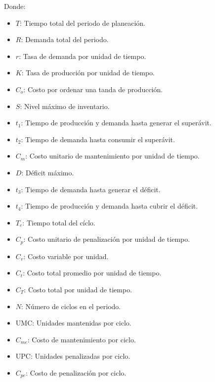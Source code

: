 \documentclass[letterpaper, 12pt]{article}
\begin{document}
    Donde:
    \begin{itemize}
        \item \(T\): Tiempo total del periodo de planeación.
        \item \(R\): Demanda total del periodo.
        \item \(r\): Tasa de demanda por unidad de tiempo.
        \item \(K\): Tasa de producción por unidad de tiempo.
        \item \(C_o\): Costo por ordenar una tanda de producción.
        \item \(S\): Nivel máximo de inventario.
        \item \(t_1\): Tiempo de producción y demanda hasta generar el superávit.
        \item \(t_2\): Tiempo de demanda hasta consumir el superávit.
        \item \(C_m\): Costo unitario de mantenimiento por unidad de tiempo.
        \item \(D\): Déficit máximo.
        \item \(t_3\): Tiempo de demanda hasta generar el déficit.
        \item \(t_4\): Tiempo de producción y demanda hasta cubrir el déficit.
        \item \(T_e\): Tiempo total del cíclo.
        \item \(C_p\): Costo unitario de penalización por unidad de tiempo.
        \item \(C_v\): Costo variable por unidad.
        \item \(C_t\): Costo total promedio por unidad de tiempo.
        \item \(C_T\): Costo total por unidad de tiempo.
        \item \(N\): Número de ciclos en el periodo.
        \item UMC: Unidades mantenidas por ciclo.
        \item \(C_{me}\): Costo de mantenimiento por ciclo.
        \item UPC: Unidades penalizadas por ciclo.
        \item \(C_{pe}\): Costo de penalización por ciclo.
    \end{itemize}
    \newpage
\end{document}
